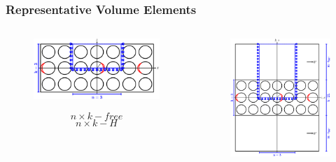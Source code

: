 \documentclass[first,firstsupp,lastsupp,last,hyperref,table]{ETHclass}
\begin{document}
\begin{frame}
\frametitle{\vspace{0.2cm}\small Representative Volume Elements}
\vspace{-1cm}
\centering
\begin{columns}[c]
\begin{column}{0.55\textwidth}
\centering
\begin{figure}
\centering
\includegraphics[width=\columnwidth]{freeThickPly.pdf}
\end{figure}
\vspace{-0.25cm}
\begin{equation*}
n\times k-free
\end{equation*}
\begin{equation*}
n\times k-H
\end{equation*}
\end{column}
\begin{column}{0.45\textwidth}
\centering
\begin{figure}
\centering
\includegraphics[width=\columnwidth]{ThickPly.pdf}

\end{figure}
\end{column}
\end{columns}
\end{frame}
\end{document}
